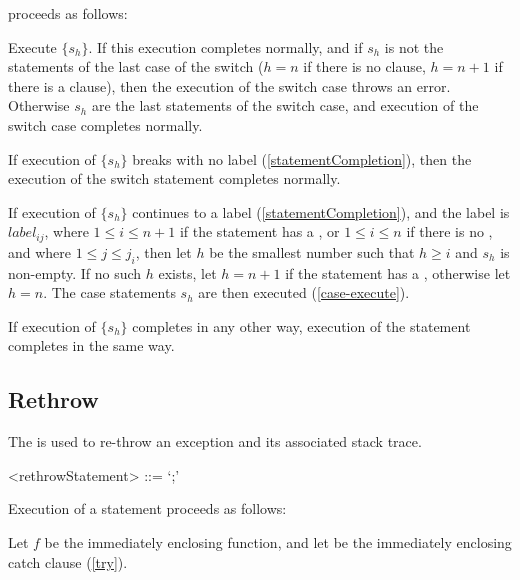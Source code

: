 \documentclass[makeidx]{article}
\begin{document}
{proceeds as follows:

\LMHash{}%
Execute $\{s_h\}$.
If this execution completes normally,
and if $s_h$ is not the statements of the last case of the switch
($h = n$ if there is no \DEFAULT{} clause,
$h = n+1$ if there is a \DEFAULT{} clause),
then the execution of the switch case throws an error.
Otherwise $s_h$ are the last statements of the switch case,
and execution of the switch case completes normally.


If execution of $\{s_h\}$ breaks with no label (\ref{statementCompletion}), then the execution of the switch statement completes normally.

If execution of $\{s_h\}$ continues to a label (\ref{statementCompletion}), and the label is $label_{ij}$, where $1 \le i \le n+1$ if the \SWITCH{} statement has a \DEFAULT{}, or $1 \le i \le n$ if there is no \DEFAULT{}, and where $1 \le j \le j_{i}$, then
let $h$ be the smallest number such that $h \ge i$ and $s_h$ is non-empty.
If no such $h$ exists, let $h = n + 1$ if the \SWITCH{} statement has a \DEFAULT{}, otherwise let $h = n$.
The case statements $s_h$ are then executed (\ref{case-execute}).

If execution of $\{s_h\}$ completes in any other way, execution of the \SWITCH{} statement completes in the same way.


\subsection{Rethrow}

\LMHash{}%
The  is used to re-throw an exception and its associated stack trace.

\begin{grammar}
<rethrowStatement> ::= \RETHROW{} `;'
\end{grammar}

\LMHash{}%
Execution of a \code{\RETHROW{}} statement proceeds as follows:

\LMHash{}%
Let $f$ be the immediately enclosing function, and let  be the immediately enclosing catch clause (\ref{try}).


}
\end{document}
